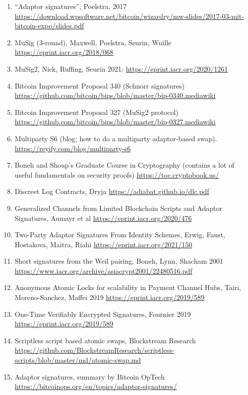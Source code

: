\documentclass[10pt,a4paper]{article}
\providecommand{\tightlist}{%
  \setlength{\itemsep}{0pt}\setlength{\parskip}{0pt}}
\begin{document}
\begin{enumerate}
\def\labelenumi{\arabic{enumi}.}
\tightlist
\item
  \protect\hypertarget{anchor-1}{}{}``Adaptor signatures'', Poelstra, 2017
  \url{https://download.wpsoftware.net/bitcoin/wizardry/mw-slides/2017-03-mit-bitcoin-expo/slides.pdf}
\item
  \protect\hypertarget{anchor-2}{}{}MuSig (3-round), Maxwell, Poelstra, Seurin, Wuille
  \url{https://eprint.iacr.org/2018/068}
\item
  \protect\hypertarget{anchor-3}{}{}MuSig2, Nick, Ruffing, Seurin 2021:   \url{https://eprint.iacr.org/2020/1261} 
\item
  \protect\hypertarget{anchor-4}{}{}Bitcoin Improvement Proposal 340 (Schnorr signatures)
  \url{https://github.com/bitcoin/bips/blob/master/bip-0340.mediawiki}
\item
  \protect\hypertarget{anchor-5}{}{}Bitcoin Improvement Proposal 327 (MuSig2 protocol)
  \url{https://github.com/bitcoin/bips/blob/master/bip-0327.mediawiki}
\item
  \protect\hypertarget{anchor-6}{}{}Multiparty S6 (blog; how to do a multiparty adaptor-based swap).
  \url{https://reyify.com/blog/multiparty-s6}
\item
  \protect\hypertarget{anchor-7}{}{}Boneh and Shoup's Graduate Course in Cryptography (contains a lot of useful fundamentals on security proofs)
  \url{https://toc.cryptobook.us/}
\item
  \protect\hypertarget{anchor-8}{}{}Discreet Log Contracts, Dryja \url{https://adiabat.github.io/dlc.pdf}
\item
  \protect\hypertarget{anchor-9}{}{}Generalized Channels from Limited Blockchain Scripts and Adaptor Signatures, Aumayr et al
  \url{https://eprint.iacr.org/2020/476}
\item
  \protect\hypertarget{anchor-10}{}{}Two-Party Adaptor Signatures From Identity Schemes, Erwig, Faust, Hostakova, Maitra, Riahi
  \url{https://eprint.iacr.org/2021/150}
\item
  \protect\hypertarget{anchor-11}{}{}Short signatures from the Weil pairing, Boneh, Lynn, Shacham 2001
  \url{https://www.iacr.org/archive/asiacrypt2001/22480516.pdf}
\item
  \protect\hypertarget{anchor-12}{}{}Anonymous Atomic Locks for scalability in Payment Channel Hubs, Tairi, Moreno-Sanchez, Maffei 2019
  \url{https://eprint.iacr.org/2019/589}
\item
  \protect\hypertarget{anchor-13}{}{}One-Time Verifiably Encrypted Signatures, Fournier 2019
  \url{https://eprint.iacr.org/2019/589}
\item
  \protect\hypertarget{anchor-14}{}{}Scriptless script based atomic swaps, Blockstream Research
  \url{https://github.com/BlockstreamResearch/scriptless-scripts/blob/master/md/atomic-swap.md}
\item
  \protect\hypertarget{anchor-15}{}{}Adaptor signatures, summary by Bitcoin OpTech
  \url{https://bitcoinops.org/en/topics/adaptor-signatures/}
  
  
\end{enumerate}
\end{document}
